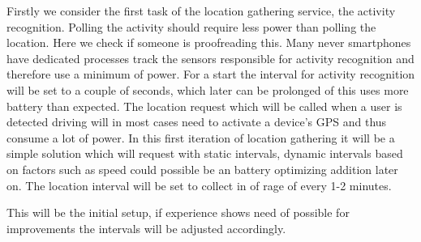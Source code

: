 Firstly we consider the first task of the location gathering service, the activity recognition.
Polling the activity should require less power than polling the location.
Here we check if someone is proofreading this.
Many never smartphones have dedicated processes track the sensors responsible for activity recognition and therefore use a minimum of power.
For a start the interval for activity recognition will be set to a couple of seconds, which later can be prolonged of this uses more battery than expected.
The location request which will be called when a user is detected driving will in most cases need to activate a device's GPS and thus consume a lot of power.
In this first iteration of location gathering it will be a simple solution which will request with static intervals, dynamic intervals based on factors such as speed could possible be an battery optimizing addition later on.
The location interval will be set to collect in of rage of every 1-2 minutes.

This will be the initial setup, if experience shows need of possible for improvements the intervals will be adjusted accordingly.
